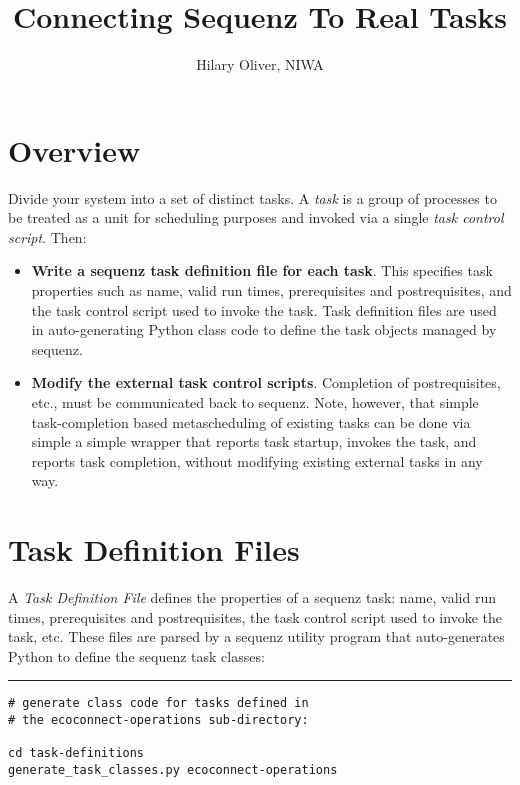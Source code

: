 \documentclass[11pt,a4paper]{article}
\title{Connecting Sequenz To Real Tasks}
\author{Hilary Oliver, NIWA}
\begin{document}
\maketitle
\tableofcontents

\section{Overview}

Divide your system into a set of distinct tasks. A {\em task} is a group
of processes to be treated as a unit for scheduling purposes and
invoked via a single {\em task control script}. Then:

\begin{itemize}

    \item \textbf{Write a sequenz task definition file for each task}.
    This specifies task properties such as name, valid run times,
    prerequisites and postrequisites, and the task control script used
    to invoke the task. Task definition files are used in
    auto-generating Python class code to define the task objects managed
    by sequenz.
    
    \item \textbf{Modify the external task control scripts}. Completion
    of postrequisites, etc., must be communicated back to sequenz. Note,
    however, that simple task-completion based metascheduling of
    existing tasks can be done via simple a simple wrapper that reports
    task startup, invokes the task, and reports task completion, without
    modifying existing external tasks in any way.

\end{itemize}

\section{Task Definition Files}

A {\em Task Definition File} defines the properties of a sequenz task:
name, valid run times, prerequisites and postrequisites, the task
control script used to invoke the task, etc.  These files are parsed by
a sequenz utility program that auto-generates Python to define the
sequenz task classes:

\lstset{language=sh, numbers=left}

{\small
\noindent
\rule{5cm}{.2mm}
\begin{lstlisting}
# generate class code for tasks defined in
# the ecoconnect-operations sub-directory:

cd task-definitions
generate_task_classes.py ecoconnect-operations
\end{lstlisting}
}
\end{document}
